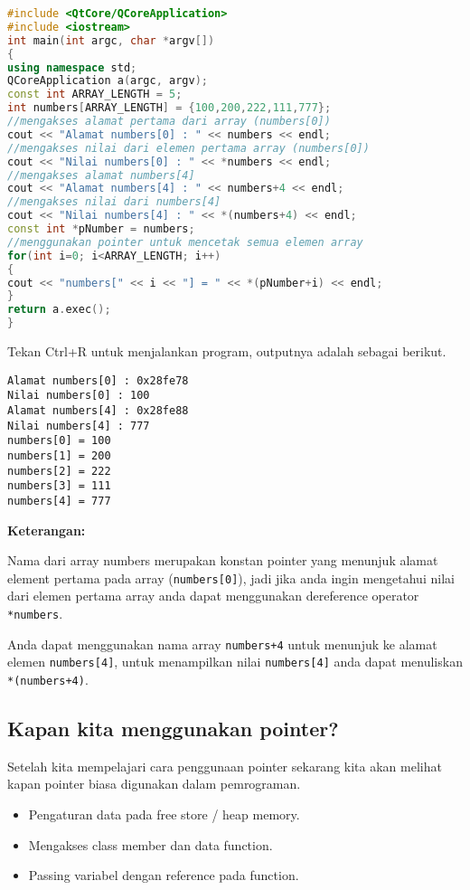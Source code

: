 \begin{lstlisting}[language=c++]
#include <QtCore/QCoreApplication>
#include <iostream>
int main(int argc, char *argv[])
{
using namespace std;
QCoreApplication a(argc, argv);
const int ARRAY_LENGTH = 5;
int numbers[ARRAY_LENGTH] = {100,200,222,111,777};
//mengakses alamat pertama dari array (numbers[0])
cout << "Alamat numbers[0] : " << numbers << endl;
//mengakses nilai dari elemen pertama array (numbers[0])
cout << "Nilai numbers[0] : " << *numbers << endl;
//mengakses alamat numbers[4]
cout << "Alamat numbers[4] : " << numbers+4 << endl;
//mengakses nilai dari numbers[4]
cout << "Nilai numbers[4] : " << *(numbers+4) << endl;
const int *pNumber = numbers;
//menggunakan pointer untuk mencetak semua elemen array
for(int i=0; i<ARRAY_LENGTH; i++)
{
cout << "numbers[" << i << "] = " << *(pNumber+i) << endl;
}
return a.exec();
}
\end{lstlisting}

Tekan Ctrl+R untuk menjalankan program, outputnya adalah sebagai
berikut.

\begin{verbatim}
Alamat numbers[0] : 0x28fe78
Nilai numbers[0] : 100
Alamat numbers[4] : 0x28fe88
Nilai numbers[4] : 777
numbers[0] = 100
numbers[1] = 200
numbers[2] = 222
numbers[3] = 111
numbers[4] = 777
\end{verbatim}

\textbf{Keterangan:}

Nama dari array numbers merupakan konstan pointer yang menunjuk alamat
element pertama pada array (\texttt{numbers{[}0{]}}), jadi jika anda
ingin mengetahui nilai dari elemen pertama array anda dapat menggunakan
dereference operator \texttt{*numbers}.

Anda dapat menggunakan nama array \texttt{numbers+4} untuk menunjuk ke
alamat elemen \texttt{numbers{[}4{]}}, untuk menampilkan nilai
\texttt{numbers{[}4{]}} anda dapat menuliskan \texttt{*(numbers+4)}.

\subsection{Kapan kita menggunakan
pointer?}\label{kapan-kita-menggunakan-pointer}

Setelah kita mempelajari cara penggunaan pointer sekarang kita akan
melihat kapan pointer biasa digunakan dalam pemrograman.

\begin{itemize}
\tightlist
\item
  Pengaturan data pada free store / heap memory.
\item
  Mengakses class member dan data function.
\item
  Passing variabel dengan reference pada function.
\end{itemize}

